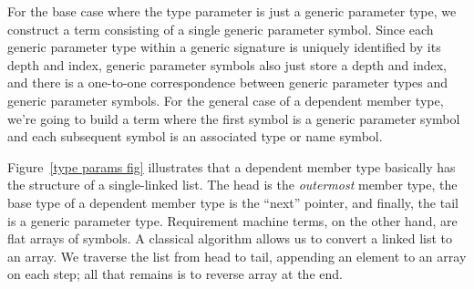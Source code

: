 \documentclass[../generics]{subfiles}
\begin{document}
For the base case where the type parameter is just a generic parameter type, we construct a term consisting of a single generic parameter symbol. Since each generic parameter type within a generic signature is uniquely identified by its depth and index, generic parameter symbols also just store a depth and index, and there is a one-to-one correspondence between generic parameter types and generic parameter symbols. 
For the general case of a dependent member type, we're going to build a term where the first symbol is a generic parameter symbol and each subsequent symbol is an associated type or name symbol.

%
%
%
%
%
%
Figure~\ref{type params fig} illustrates that a dependent member type basically has the structure of a single-linked list. The head is the \emph{outermost} member type, the base type of a dependent member type is the ``next'' pointer, and finally, the tail is a generic parameter type. Requirement machine terms, on the other hand, are flat arrays of symbols. A classical algorithm allows us to convert a linked list to an array. We traverse the list from head to tail, appending an element to an array on each step; all that remains is to reverse array at the end.
\end{document}
